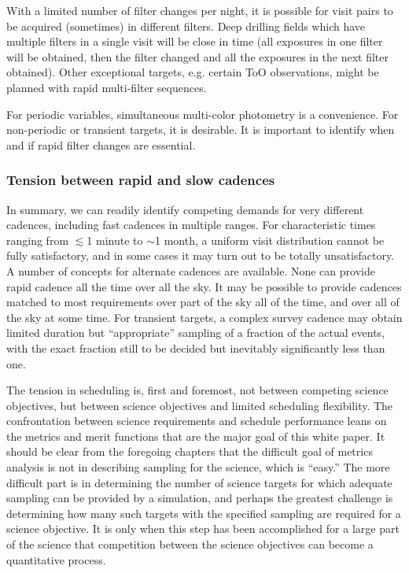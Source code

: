 With a limited number of filter changes per night, it is possible for
visit pairs to be acquired (sometimes) in different filters.  Deep
drilling fields which have multiple filters in a single visit will be
close in time (all exposures in one filter will be obtained, then the
filter changed and all the exposures in the next filter obtained).
Other exceptional targets, e.g. certain ToO observations, might be
planned with rapid multi-filter sequences.

For periodic variables, simultaneous multi-color photometry is a
convenience.  For non-periodic or transient targets, it is desirable. It
is important to identify when and if rapid filter changes are essential.


\subsubsection{Tension between rapid and slow cadences}

In summary, we can readily identify competing demands for very different
cadences, including fast cadences in multiple ranges. For characteristic
times ranging from  $\lesssim$1 minute to $\sim$1 month, a uniform visit
distribution cannot be fully satisfactory, and in some cases it may turn
out to be totally unsatisfactory.  A number of concepts for alternate
cadences are available.  None can provide rapid cadence all the time
over all the sky. It may be possible to provide cadences matched to most
requirements over part of the sky all of the time, and over all of the
sky at some time. For transient targets, a complex survey cadence may
obtain limited duration but ``appropriate'' sampling of a fraction of
the actual events, with the exact fraction still to be decided but
inevitably significantly less than one.

The tension in scheduling is, first and foremost, not between competing
science objectives, but between science objectives and limited
scheduling flexibility. The confrontation between science requirements
and schedule performance leans on the metrics and merit functions that
are the major goal of this white paper.  It should be clear from the
foregoing chapters that the difficult goal of metrics analysis is not in
describing sampling for the science, which is ``easy.''  The more
difficult part is in determining the number of science targets for which
adequate sampling can be provided by a simulation, and perhaps the
greatest challenge is determining how many such targets with the
specified sampling are required for a science objective.  It is only
when this step has been accomplished for a large part of the science
that competition between the science objectives can become a
quantitative process.

